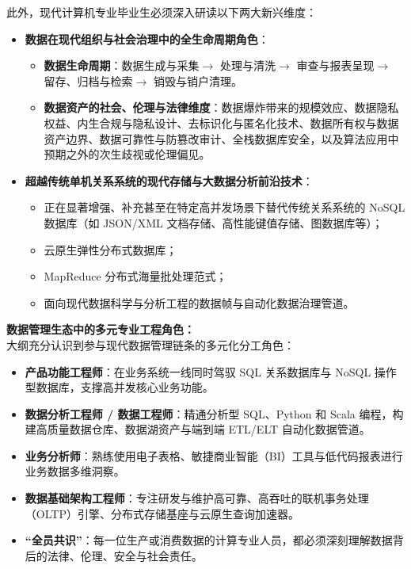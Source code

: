 \begin{preamblebox}[知识领域概述与时代演进]
此外，现代计算机专业毕业生必须深入研读以下两大新兴维度：
\begin{itemize}
    \item \textbf{数据在现代组织与社会治理中的全生命周期角色}：
    \begin{itemize}
        \item \textbf{数据生命周期}：数据生成与采集$\to$ 处理与清洗$\to$ 审查与报表呈现$\to$ 留存、归档与检索$\to$ 销毁与销户清理。
        \item \textbf{数据资产的社会、伦理与法律维度}：数据爆炸带来的规模效应、数据隐私权益、内生合规与隐私设计、去标识化与匿名化技术、数据所有权与数据资产边界、数据可靠性与防篡改审计、全栈数据库安全，以及算法应用中预期之外的次生歧视或伦理偏见。
    \end{itemize}
    \item \textbf{超越传统单机关系系统的现代存储与大数据分析前沿技术}：
    \begin{itemize}
        \item 正在显著增强、补充甚至在特定高并发场景下替代传统关系系统的 NoSQL 数据库（如 JSON/XML 文档存储、高性能键值存储、图数据库等）；
        \item 云原生弹性分布式数据库；
        \item MapReduce 分布式海量批处理范式；
        \item 面向现代数据科学与分析工程的数据帧与自动化数据治理管道。
    \end{itemize}
\end{itemize}

\textbf{数据管理生态中的多元专业工程角色：}\\
大纲充分认识到参与现代数据管理链条的多元化分工角色：
\begin{itemize}
    \item \textbf{产品功能工程师}：在业务系统一线同时驾驭 SQL 关系数据库与 NoSQL 操作型数据库，支撑高并发核心业务功能。
    \item \textbf{数据分析工程师 / 数据工程师}：精通分析型 SQL、Python 和 Scala 编程，构建高质量数据仓库、数据湖资产与端到端 ETL/ELT 自动化数据管道。
    \item \textbf{业务分析师}：熟练使用电子表格、敏捷商业智能（BI）工具与低代码报表进行业务数据多维洞察。
    \item \textbf{数据基础架构工程师}：专注研发与维护高可靠、高吞吐的联机事务处理（OLTP）引擎、分布式存储基座与云原生查询加速器。
    \item \textbf{“全员共识”}：每一位生产或消费数据的计算专业人员，都必须深刻理解数据背后的法律、伦理、安全与社会责任。
\end{itemize}


\end{preamblebox}
